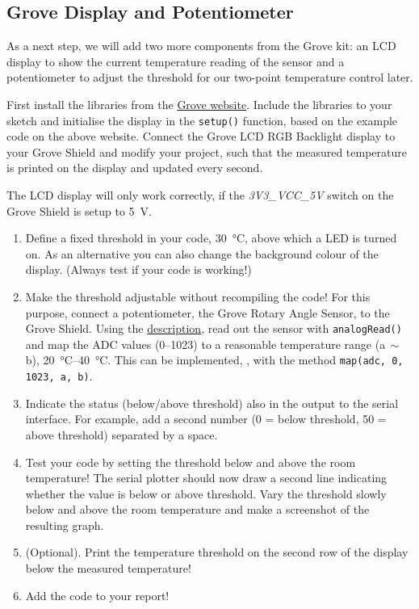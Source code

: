 \subsection{Grove Display and Potentiometer}\label{sec:grovedisp}
As a next step, we will add two more components from the Grove kit: an LCD display to show the current temperature reading of the sensor and a potentiometer to adjust the threshold for our two-point temperature control later. 
%
\begin{task}
  First install the libraries from the \href{http://wiki.seeedstudio.com/Grove-LCD_RGB_Backlight/}{Grove website}. Include the libraries to your sketch and initialise the display in the \texttt{setup()} function, based on the example code on the above website. Connect the Grove LCD RGB Backlight display to your Grove Shield and modify your project, such that the measured temperature is printed on the display and updated every second.
\end{task}
%
\begin{note}
  The LCD display will only work correctly, if the \textit{3V3\_VCC\_5V} switch on the Grove Shield is setup to \SI{5}{\V}.
\end{note}
%
\begin{task}
  \begin{enumerate}
    \item Define a fixed threshold in your code, \eg \SI{30}{\celsius}, above which a LED is turned on. As an alternative you can also change the background colour of the display. (Always test if your code is working!)
    \item Make the threshold adjustable without recompiling the code! For this purpose, connect a potentiometer, \eg the Grove Rotary Angle Sensor, to the Grove Shield. Using the \href{http://wiki.seeedstudio.com/Grove-Rotary_Angle_Sensor/}{description}, read out the sensor with \texttt{analogRead()} and map the \ac{ADC} values (\SIrange{0}{1023}{}) to a reasonable temperature range (a$\,\sim\, $b), \eg \SIrange{20}{40}{\celsius}. This can be  implemented, \eg, with the method  \texttt{map(adc, 0, 1023, a, b)}.
    \item Indicate the status (below/above threshold) also in the output to the serial interface. For example, add a second number (0 = below threshold, 50 = above threshold) separated by a space.
    \item Test your code by setting the threshold below and above the room temperature! The serial plotter should now draw a second line indicating whether the value is below or above threshold. Vary the threshold slowly below and above the room temperature and make a screenshot of the resulting graph.
    \item (Optional). Print the temperature threshold on the second row of the display below the measured temperature!
    \item Add the code to your report!
  \end{enumerate}
\end{task}
%
